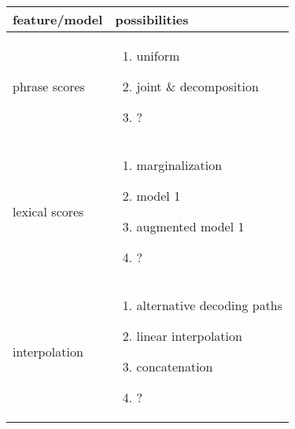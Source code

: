 

\begin{tabular}{l|p{9cm}|}
\toprule
feature/model & possibilities \\
\toprule
phrase scores & \begin{enumerate} 
	\item uniform 
	\item joint \& decomposition 
	\item ?
\end{enumerate} \\
lexical scores & 
\begin{enumerate} 
\item marginalization 
\item model 1 
\item augmented model 1 
\item ? 
\end{enumerate}
\\
interpolation & 
\begin{enumerate} 
\item alternative decoding paths 
\item linear interpolation 
\item concatenation 
\item ? 
\end{enumerate} \\
\bottomrule
\end{tabular}